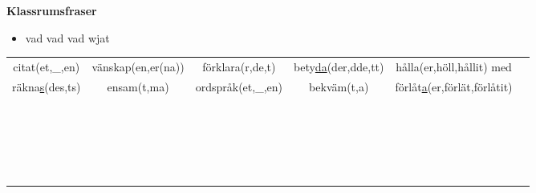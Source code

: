 
\begin{flushleft}
    \textbf{Klassrumsfraser}
    \begin{itemize}
        \item vad vad vad wjat
    \end{itemize}
\end{flushleft}

\begin{center}
    \begin{adjustwidth}{-2.2cm}{}
        \begin{tabular}{|c c c c c c|}
            \hline
            citat(et,\_,en) & vänskap(en,er(na)) & förklara(r,de,t) & bety\underline{da}(der,dde,tt) & hålla(er,höll,hållit) med &  \\
            räkna\underline{s}(des,ts) & ensam(t,ma) & ordspråk(et,\_,en) & bekväm(t,a) & förlåt\underline{a}(er,förlät,förlåtit) &  \\
             &  &  &  &  &  \\
             &  &  &  &  &  \\
             &  &  &  &  &  \\
             &  &  &  &  &  \\
             &  &  &  &  &  \\
             &  &  &  &  &  \\
             &  &  &  &  &  \\
             &  &  &  &  &  \\
             &  &  &  &  &  \\
             &  &  &  &  &  \\
             &  &  &  &  &  \\
             &  &  &  &  &  \\
             &  &  &  &  &  \\
             &  &  &  &  &  \\
             &  &  &  &  &  \\
             &  &  &  &  &  \\
             &  &  &  &  &  \\
             &  &  &  &  &  \\
             &  &  &  &  &  \\
             &  &  &  &  &  \\
             &  &  &  &  &  \\
            \hline
        \end{tabular}
    \end{adjustwidth}
\end{center}

